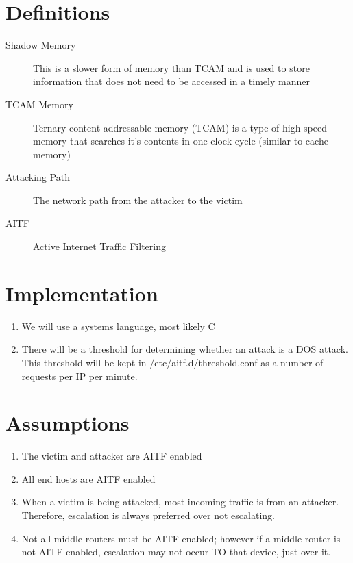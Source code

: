 \documentclass[11pt]{article}
\begin{document}
\section{Definitions}
\begin{description}
	\item[Shadow Memory] This is a slower form of memory than TCAM and is used to store information that does not need to be accessed in a timely manner
	\item[TCAM Memory] Ternary content-addressable memory (TCAM) is a type of high-speed memory that searches it’s contents in one clock cycle (similar to cache memory)
	\item[Attacking Path] The network path from the attacker to the victim
	\item[AITF] Active Internet Traffic Filtering
\end{description}

\section{Implementation}
\begin{enumerate}
	\item We will use a systems language, most likely C
	\item There will be a threshold for determining whether an attack is a DOS attack. This threshold will be kept in /etc/aitf.d/threshold.conf as a number of requests per IP per minute.
\end{enumerate}




\section{Assumptions}
\begin{enumerate}
	\item The victim and attacker are AITF enabled
	\item All end hosts are AITF enabled
	\item When a victim is being attacked, most incoming traffic is from an attacker. Therefore, escalation is always preferred over not escalating.
	\item Not all middle routers must be AITF enabled; however if a middle router is not AITF enabled, escalation may not occur TO that device, just over it.
\end{enumerate}
\end{document}
